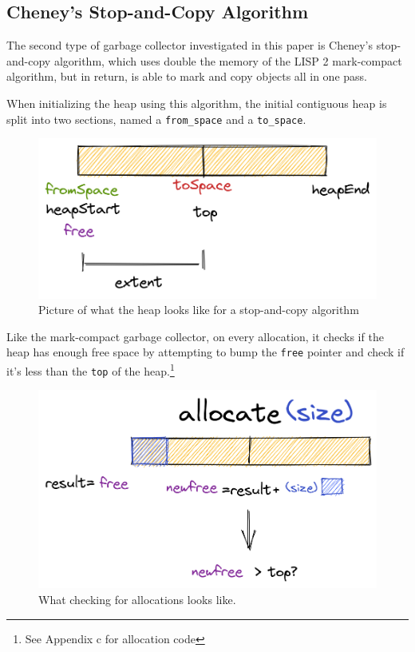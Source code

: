 \documentclass[index]{subfiles}
\begin{document}
\subsection{Cheney's Stop-and-Copy Algorithm}

The second type of garbage collector investigated in this paper is Cheney's stop-and-copy algorithm, which uses double the memory of the LISP 2 mark-compact algorithm, but in return, is able to mark and copy objects all in one pass.

When initializing the heap using this algorithm, the initial contiguous heap is split into two sections, named a \verb+from_space+ and a \verb+to_space+\cite[Chapter~2]{gc_handbook}.

\begin{figure}[H]
    \centering
    \includegraphics[scale=0.3]{pics/split-heap-diagram.png}
    \caption{Picture of what the heap looks like for a stop-and-copy algorithm}
\end{figure}

Like the mark-compact garbage collector, on every allocation, it checks if the heap has enough free space by attempting to bump the \verb+free+ pointer and check if it's less than the \verb+top+ of the heap.\footnote{See Appendix c for allocation code}

\begin{figure}[H]
    \centering
    \includegraphics[scale=0.3]{pics/allocation.png}
    \caption{What checking for allocations looks like.}
\end{figure}
\end{document}
